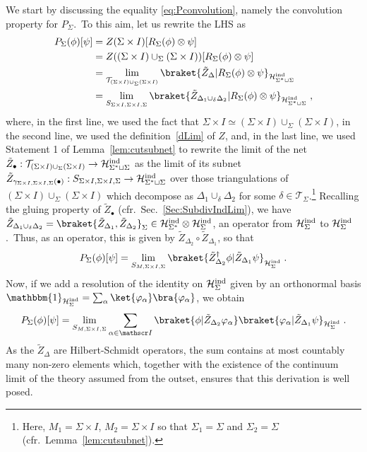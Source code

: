\documentclass[11pt]{article}
\newcommand{\Hil}{\mathcal{H}}
\newcommand{\Hind}{\mathcal{H}_{\Sigma}^{\rm ind}}
\newcommand{\h}{\mathcal{H}}
\theoremstyle{definition}
\numberwithin{equation}{section}
\begin{document}
\noindent
We start by discussing the equality \eqref{eq:Pconvolution}, namely the convolution property for $P_{\Sigma}$.~To this aim, let us rewrite the LHS as
\begin{equation}
    \begin{split}
    P_{\Sigma}(\phi)[\psi]&=Z(\Sigma\times I)[R_{\Sigma}(\phi)\otimes\psi]\\
    &=Z((\Sigma\times I)\cup_{\Sigma}(\Sigma\times I))[R_{\Sigma}(\phi)\otimes\psi]\\
    &=\lim_{\mathcal T_{(\Sigma\times I)\cup_{\Sigma}(\Sigma\times I)}}\braket{\tilde{Z}_{\Delta}|R_{\Sigma}(\phi)\otimes\psi}_{\h^{\rm ind}_{\Sigma^*\sqcup\Sigma}}\\
    &=\lim_{S_{\Sigma\times I,\Sigma\times I,\Sigma}}\braket{\tilde{Z}_{\Delta_{1}\cup_{\delta}\Delta_{2}}|R_{\Sigma}(\phi)\otimes\psi}_{\h^{\rm ind}_{\Sigma^*\sqcup\Sigma}}\;,
    \end{split}
\end{equation}
where, in the first line, we used the fact that $\Sigma\times I\simeq (\Sigma\times I)\cup_{\Sigma}(\Sigma\times I)$, in the second line, we used the definition~\eqref{dLim} of $Z$, and, in the last line, we used Statement 1 of Lemma~\ref{lem:cutsubnet} to rewrite the limit of the net $\tilde{Z}_{\bullet}:\mathcal T_{(\Sigma\times I)\cup_{\Sigma}(\Sigma\times I)}\to\h^{\rm ind}_{\Sigma^*\sqcup\Sigma}$ as the limit of its subnet $\tilde{Z}_{\gamma_{\Sigma\times I,\Sigma\times I,\Sigma}(\bullet)}:S_{\Sigma\times I,\Sigma\times I,\Sigma}\to\h^{\rm ind}_{\Sigma^*\sqcup\Sigma}$ over those triangulations of $(\Sigma\times I)\cup_{\Sigma}(\Sigma\times I)$ which decompose as $\Delta_1\cup_\delta\Delta_{2}$ for some $\delta\in\mathcal T_{\Sigma}$.\footnote{Here, $M_1=\Sigma\times I$, $M_2=\Sigma\times I$ so that $\Sigma_1=\Sigma$ and $\Sigma_2=\Sigma$ (cfr.~Lemma~\ref{lem:cutsubnet}).}
Recalling the gluing property of $\tilde{Z}_{\bullet}$ (cfr.~Sec.~\ref{Sec:SubdivIndLim}), we have $\tilde{Z}_{\Delta_1\cup_{\delta}\Delta_{2}}=\braket{\tilde{Z}_{\Delta_1},\tilde{Z}_{\Delta_{2}}}_{\Sigma}\in \Hil_{\Sigma^*}^{\rm ind}\otimes\Hind$, an operator from $\Hind$ to $\Hind$.~Thus, as an operator, this is given by $\tilde{Z}_{\Delta_{2}}\circ\tilde{Z}_{\Delta_1}$, so that
\begin{equation}
    P_{\Sigma}(\phi)[\psi]=\lim_{S_{M,\Sigma\times I,\Sigma}}\braket{\tilde{Z}_{\Delta_{2}}^\dagger\phi|\tilde{Z}_{\Delta_{1}}\psi}_{\Hind}\;.
\end{equation}
Now, if we add a resolution of the identity on $\Hind$ given by an orthonormal basis $\mathbbm{1}_{\Hind}=\sum_{\alpha}\ket{\varphi_{\alpha}}\bra{\varphi_{\alpha}}$, we obtain
\begin{equation}\label{eq:convLHS}
    P_{\Sigma}(\phi)[\psi]=\lim_{S_{M,\Sigma\times I,\Sigma}}\sum_{\alpha\in\mathscr I}\braket{\phi|\tilde{Z}_{\Delta_{2}}\varphi_{\alpha}}\braket{\varphi_{\alpha}|\tilde{Z}_{\Delta_{1}}\psi}_{\Hind}\;.
\end{equation}
As the $\tilde{Z}_{\Delta}$ are Hilbert-Schmidt operators, the sum contains at most countably many non-zero elements which, together with the existence of the continuum limit of the theory assumed from the outset, ensures that this derivation is well posed.
\end{document}

